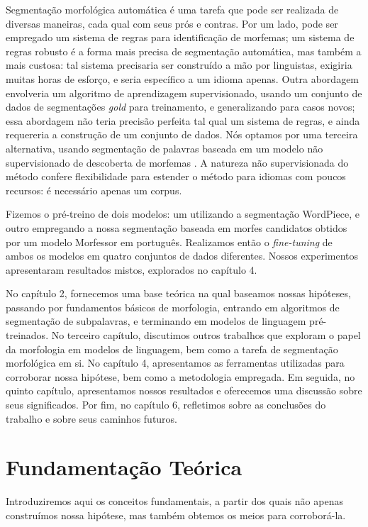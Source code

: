 \documentclass[cic,tc]{iiufrgs}
\begin{document}
Segmentação morfológica automática é uma tarefa que pode ser realizada de diversas maneiras, cada qual com seus prós e contras. Por um lado, pode ser empregado um sistema de regras para identificação de morfemas; um sistema de regras robusto é a forma mais precisa de segmentação automática, mas também a mais custosa: tal sistema precisaria ser construído a mão por linguistas, exigiria muitas horas de esforço, e seria específico a um idioma apenas. Outra abordagem envolveria um algoritmo de aprendizagem supervisionado, usando um conjunto de dados de segmentações \emph{gold} para treinamento, e generalizando para casos novos; essa abordagem não teria precisão perfeita tal qual um sistema de regras, e ainda requereria a construção de um conjunto de dados. Nós optamos por uma terceira alternativa, usando segmentação de palavras baseada em um modelo não supervisionado de descoberta de morfemas \cite{creutz-lagus-2002-unsupervised}. A natureza não supervisionada do método confere flexibilidade para estender o método para idiomas com poucos recursos: é necessário apenas um corpus.

Fizemos o pré-treino de dois modelos: um utilizando a segmentação WordPiece, e outro empregando a nossa segmentação baseada em morfes candidatos obtidos por um modelo Morfessor em português. Realizamos então o \emph{fine-tuning} de ambos os modelos em quatro conjuntos de dados diferentes. Nossos experimentos apresentaram resultados mistos, explorados no capítulo 4.

No capítulo 2, fornecemos uma base teórica na qual baseamos nossas hipóteses, passando por fundamentos básicos de morfologia, entrando em algoritmos de segmentação de subpalavras, e terminando em modelos de linguagem pré-treinados. No terceiro capítulo, discutimos outros trabalhos que exploram o papel da morfologia em modelos de linguagem, bem como a tarefa de segmentação morfológica em si. No capítulo 4, apresentamos as ferramentas utilizadas para corroborar nossa hipótese, bem como a metodologia empregada. Em seguida, no quinto capítulo, apresentamos nossos resultados e oferecemos uma discussão sobre seus significados. Por fim, no capítulo 6, refletimos sobre as conclusões do trabalho e sobre seus caminhos futuros.


\chapter{Fundamentação Teórica}
Introduziremos aqui os conceitos fundamentais, a partir dos quais não apenas construímos nossa hipótese, mas também obtemos os meios para corroborá-la.
\end{document}

